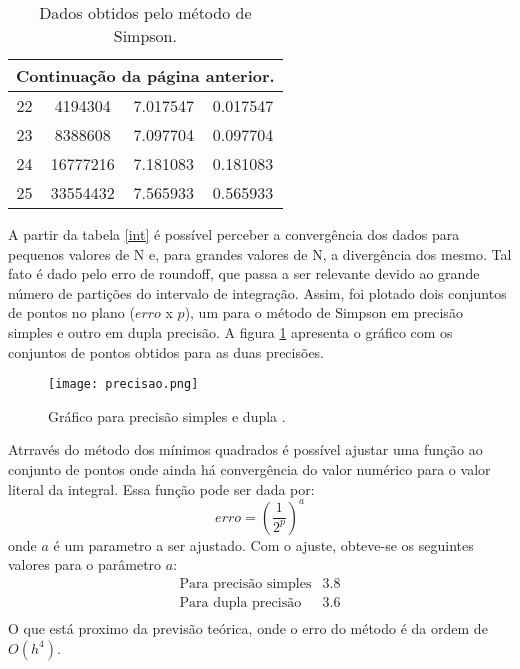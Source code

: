 \documentclass[a4paper,11pt, twoside]{article}
\begin{document}
    {\linespread{1}
    \begin{table}[!th]
        \begin{center}
            \begin{tabular}{ c c c c }
                \midrule
                \multicolumn{4}{l}{{\small Continuação da página anterior.}}\\
                \midrule
                22 &  4194304 & 7.017547 & 0.017547\\
                \midrule
                23 &  8388608 & 7.097704 & 0.097704\\
                \midrule
                24 & 16777216 & 7.181083 & 0.181083\\
                \midrule
                25 & 33554432 & 7.565933 & 0.565933\\
                \midrule
            \end{tabular}
        \end{center}
        \caption{Dados obtidos pelo método de Simpson.}\label{simp}
    \end{table}}
    \newpage
    A partir da tabela \ref{int} é possível perceber a convergência dos dados para pequenos
    valores de N
    e, para grandes valores de N, a divergência dos mesmo. Tal fato é dado pelo erro de roundoff,
    que passa a ser relevante devido ao grande número de partições do intervalo de integração.
    Assim, foi plotado dois conjuntos de pontos no plano ($erro$ x $p$), um para o método de Simpson
    em precisão simples e outro em dupla precisão.
    A figura \ref{precisao} apresenta o gráfico com  os conjuntos de pontos obtidos para as duas
    precisões.
    \begin{figure}[!ht]
        \begin{center}
            \texttt{[image: precisao.png]}
        \end{center}
        \caption{Gráfico para precisão simples e dupla  .\label{precisao}}
    \end{figure}

    Atrravés do método dos mínimos quadrados é possível ajustar 
    uma função ao conjunto de pontos onde ainda há 
    convergência do valor numérico para o valor literal da integral. Essa função pode ser dada por:
    \begin{equation}
        erro = {\left(\frac{1}{2^p}\right)}^a
    \end{equation}
    onde $a$ é um parametro a ser ajustado.
    Com o ajuste,
    obteve-se os seguintes valores para o parâmetro $a$:
    \begin{eqnarray*}
        \textrm{Para precisão simples} & 3.8\\
        \textrm{Para dupla precisão} & 3.6\\
    \end{eqnarray*}
    O que está proximo da previsão teórica, onde o erro do método é da ordem de $O(h^4)$.
    
\end{document}
